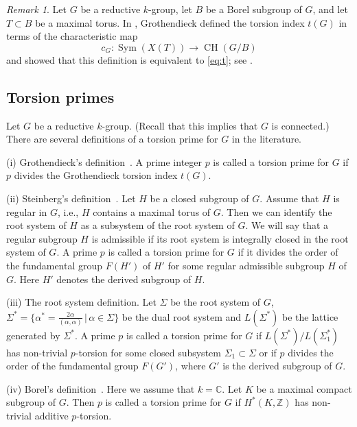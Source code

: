 \documentclass[12pt]{amsart}
\numberwithin{equation}{section}
\theoremstyle{remark}
\newtheorem{remark}[theorem]{Remark}
\begin{document}
\begin{remark} \label{rem.chow} 
    Let $G$ be a reductive $k$-group, let $B$ be a Borel subgroup of $G$, and let $T \subset B$ be a maximal torus. In \cite[Chapter 4]{grothendieck-special}, Grothendieck defined the torsion index $t(G)$ in terms of the characteristic map 
\[ c_G \colon \operatorname{Sym}(X(T)) \longrightarrow \operatorname{CH}(G/B)\]
and showed that this definition is equivalent to \eqref{eq:t}; see \cite[Theorem 2]{grothendieck-special}.
\end{remark}

\subsection{Torsion primes}
Let $G$ be a reductive $k$-group. (Recall that this implies that $G$ is connected.) There are several definitions of a torsion prime for $G$ in the literature.

\smallskip
(i) Grothendieck's definition~\cite[Definition 3]{grothendieck-special}. A prime integer $p$ is called a torsion prime for $G$ if $p$ divides the Grothendieck torsion index $t(G)$.

\smallskip
(ii) Steinberg's definition~\cite[Definition 2.1]{steinberg-torsion}. Let $H$ be a closed subgroup of $G$. Assume that $H$ is regular in $G$, i.e., $H$ contains a maximal torus of $G$. Then we can identify the root system of $H$ as a subsystem of the root system of $G$. We will say that a regular subgroup $H$ is admissible if its root system is integrally closed in the root system of $G$. A prime $p$ is called a torsion prime for $G$ if it divides the order of the fundamental group $F(H')$ of $H'$ for some regular admissible subgroup $H$ of $G$. Here $H'$ denotes the derived subgroup of $H$.

\smallskip
(iii) The root system definition. Let $\Sigma$ be the root system of $G$, $\Sigma^* = \{ \alpha^* = \frac{2 \alpha}{(\alpha, \alpha)} \, | \, \alpha \in \Sigma \}$ be the dual root system and $L(\Sigma^*)$ be the lattice generated by $\Sigma^*$. 
A prime $p$ is called a torsion prime for $G$ if $L(\Sigma^*)/L(\Sigma_1^*)$ has non-trivial $p$-torsion for some closed subsystem $\Sigma_1 \subset \Sigma$ or if $p$ divides the order of the fundamental group $F(G')$, where $G'$ is the derived subgroup of $G$.

\smallskip
(iv) Borel's definition~\cite{borel-tohoku}. Here we assume that $k =\mathbb{C}$. Let $K$ be a maximal compact subgroup of $G$. Then $p$ is called a torsion prime for $G$ if $H^*(K, \mathbb Z)$ has non-trivial additive $p$-torsion.
\end{document}
